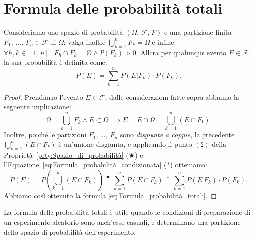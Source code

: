     \section{Formula delle probabilità totali}
        \begin{defn}\label{defn:Probabilità_totali}
            Consideriamo uno spazio di probabilità $(\Omega,\,\mathscr{F},\,P)$ e una partizione finita $F_1,\,\ldots,\,F_n \in \mathscr{F}$ di $\Omega$; valga inoltre $\bigcup_{k=1}^{n} F_k = \Omega$ e infine $\forall h,k \in [1,\,n] \,:\, F_h \cap F_k = \text{\O} \land P(F_k) > 0$.
            Allora per qualunque evento $E \in \mathscr{F}$ la sua probabilità è definita come:
            \begin{equation}\label{eq:Formula_probabilità_totali}
                P(E) = \sum_{k=1}^{n} P(E|F_k) \cdot P(F_k)
            . 
            \end{equation}
        \end{defn}
        \begin{proof}
            Prendiamo l'evento $E \in \mathscr{F}$; dalle considerazioni fatte sopra abbiamo la seguente implicazione:  \[
                \Omega = \bigcup_{k=1}^{n} F_k \land E \subset \Omega \implies E = E \cap \Omega = \bigcup_{k=1}^{n} (E \cap F_k)
            .\] 
            Inoltre, poiché le partizioni $F_1,\,\ldots,\,F_n$ sono \emph{disgiunte a coppie}, la precedente $\bigcup_{k=1}^{n} (E \cap F_k)$ è un'unione disgiunta, e applicando il punto $(2)$ della Proprietà~\ref{prty:Spazio_di_probabilità} ($\bigstar$) e l'Equazione~\ref{eq:Formula_probabilità_condizionata} ($\ast$) otteniamo: \[
                P(E) = P\left(\bigcup_{k=1}^{n} (E \cap F_k)\right) \overset{\bigstar}{=} \sum_{k=1}^{n} P(E \cap F_k) \overset{\ast}{=} \sum_{k=1}^{n} P(E|F_k) \cdot P(F_k)
            .\] 
            Abbiamo così ottenuto la formula \eqref{eq:Formula_probabilità_totali}.
        \end{proof}
        \begin{obsv}
            La formula delle probabilità totali è utile quando le condizioni di preparazione di un esperimento aleatorio sono anch'esse casuali, e determinano una partizione dello spazio di probabilità dell'esperimento.
        \end{obsv}
